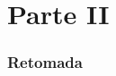 \documentclass[10pt, compress, aspectratio=43, xcolor={table,usenames,dvipsnames}]{beamer}
\begin{document}
\part{Parte II}

\maketitle

\section{Retomada}

%
%
%
%
%
%
%
\end{document}
